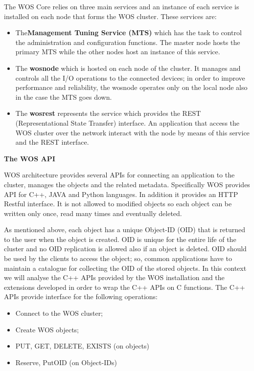 The WOS Core relies on three main services and an instance of each service is installed on each node that forms the WOS cluster. These services are:
\begin{itemize}
\item The\textbf{Management Tuning Service (MTS)} which has the task to control the administration and configuration functions.
The master node hosts the primary MTS while the other nodes host an instance of this service.

\item The \textbf{wosnode} which is hosted on each node of the cluster. It manages and controls all the I/O operations to the connected devices; in order to improve performance and reliability, the wosnode operates only on the local node also in the case the MTS goes down.

\item The \textbf{wosrest} represents the service which provides the REST (Representational State Transfer) interface. An application that access the WOS cluster over the network interact with the node by means of this service and the REST interface.
\end{itemize}

\textbf{The WOS API}

WOS architecture provides several APIs for connecting an application to the cluster, manages the objects and the related metadata.
Specifically WOS provides API for C++, JAVA and Python languages.
In addition it provides an HTTP Restful interface.
It is not allowed to modified objects so each object can be written only once, read many times and eventually deleted.

As mentioned above, each object has a unique Object-ID (OID) that is returned to the user when the object is created.
OID is unique for the entire life of the cluster and no OID replication is allowed also if an object is deleted.
OID should be used by the clients to access the object; so, common applications have to maintain a catalogue for collecting the OID of the stored objects.
In this context we will analyse the C++ APIs provided by the WOS installation and the extensions developed in order to wrap the C++ APIs on C functions.
The C++ APIs provide interface for the following operations:
\begin{itemize}
	\item Connect to the WOS cluster;
	\item Create WOS objects;
	\item PUT, GET, DELETE, EXISTS (on objects)
	\item Reserve, PutOID (on Object-IDs)
\end{itemize}

